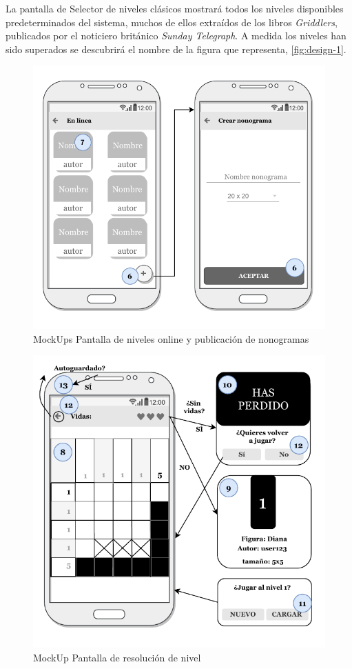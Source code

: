 La pantalla de Selector de niveles clásicos mostrará todos los niveles disponibles predeterminados del sistema,
muchos de ellos extraídos de los libros \textit{Griddlers}, publicados por el noticiero británico 
\textit{Sunday Telegraph}.
A medida los niveles han sido superados se descubrirá el nombre de la figura que representa,  \autoref{fig:design-1}.

\begin{figure}[H]
    \centering
    \includegraphics[scale=0.83]{images/screen3.pdf}
    \caption{MockUps Pantalla de niveles online y publicación de nonogramas}
    \label{fig:design-2}
\end{figure}

\begin{figure}[H]
  \centering
  \includegraphics[scale=0.83]{images/screen4.pdf}
  \caption{MockUp Pantalla de resolución de nivel}
  \label{fig:design-3}
\end{figure}

